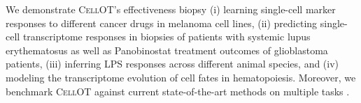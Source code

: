 We demonstrate \textsc{CellOT}'s effectiveness biopsy
(i) learning single-cell marker responses to different cancer drugs in melanoma cell lines,
(ii) predicting single-cell transcriptome responses in biopsies of patients with systemic lupus erythematosus as well as Panobinostat treatment outcomes of glioblastoma patients,
(iii) inferring LPS responses across different animal species,
and (iv) modeling the transcriptome evolution of cell fates in hematopoiesis.
Moreover, we benchmark \textsc{CellOT} against current state-of-the-art methods on multiple tasks \cite{lopez2018, lotfollahi2019}.

